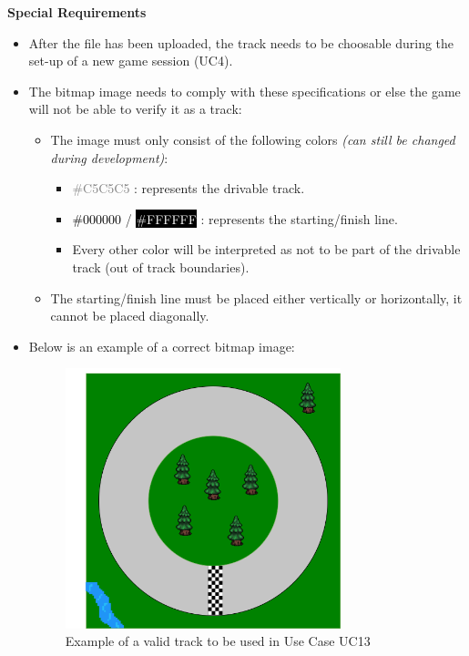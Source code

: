 			\textbf{Special Requirements}
				\begin{itemize}
					\item After the file has been uploaded, the track needs to be choosable during the set-up of a new game session (UC4).
					\item The bitmap image needs to comply with these specifications or else the game will not be able to verify it as a track:
					\begin{itemize}
						\item The image must only consist of the following colors \textit{(can still be changed during development)}:
						\begin{itemize}
							\item \textcolor{gray}{\#C5C5C5} : represents the drivable track.
							\item \textcolor{black}{\#000000} / \colorbox{black}{\textcolor{white}{\#FFFFFF}} : represents the starting/finish line.
							\item Every other color will be interpreted as not to be part of the drivable track (out of track boundaries).
						\end{itemize}
						\item The starting/finish line must be placed either vertically or horizontally, it cannot be placed diagonally.
					\end{itemize}

					\newpage

					\item Below is an example of a correct bitmap image:
					\begin{figure}[H]
						\centering
						\includegraphics[width=8cm,keepaspectratio,center]{img/Use-Case-Model_UC13_Track-Requirements_Track-Example.png}
						\caption{Example of a valid track to be used in Use Case UC13}
					\end{figure}
				\end{itemize}


